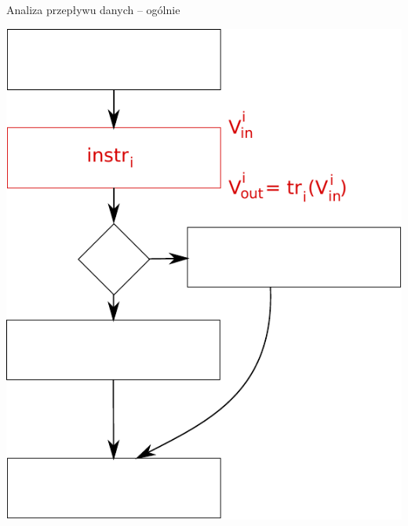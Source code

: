 \documentclass{beamer}
\begin{document}
\begin{frame}{Analiza przepływu danych -- ogólnie}
\begin{center}
  \includegraphics[scale=0.55]{img/dataflow-1.pdf}  
\end{center}
\end{frame}
\end{document}
